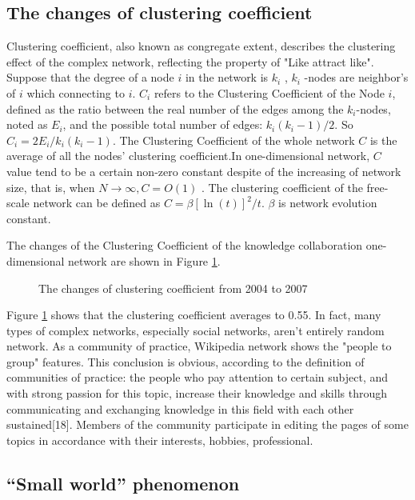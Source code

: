 \documentclass{elsarticle}
\begin{document}
\subsection{ The changes of clustering coefficient}
\label{sec:chang-clust-coeff}

Clustering coefficient, also known as congregate extent, describes the
clustering effect of the complex network, reflecting the property
of "Like attract like". Suppose that the degree of a node $i$ in the
network is $k_i$  , $k_i$ -nodes are neighbor's of $i$ which
connecting to $i$.  $C_i$  refers to the Clustering
Coefficient of the Node $i$,  defined as the ratio between the
real number of the edges among the $k_i$-nodes, noted as $E_i$, and the possible total
number of edges: $k_i(k_i-1)/2$. So  $C_i=2E_i/k_i(k_i-1)$. The
Clustering Coefficient of the whole network $C$ is the average of all
the nodes’ clustering coefficient.In one-dimensional network, $C$ value  tend to be a certain non-zero
constant despite of the increasing of network size, that is, when
$N\rightarrow\infty,C=O(1)$ . The clustering coefficient of the
free-scale network  can be defined as $C=\beta[\ln(t)]^2/t$. $\beta$
is network evolution constant.

The changes of the Clustering Coefficient of the knowledge
collaboration one-dimensional network are shown in Figure \ref{fig:cluster-coeff}.
\begin{figure}[htpb]

  \centering
  \scalebox{0.3}{\texttt{[image: 04]}}
  \caption{ The changes of clustering coefficient from 2004 to 2007}
    \label{fig:cluster-coeff}
\end{figure}
 
 Figure \ref{fig:cluster-coeff} 
shows that the clustering coefficient averages to 0.55. In fact, many
types of complex networks, especially social networks, aren’t entirely
random network. As a community of practice, Wikipedia network shows
the "people to group" features. This conclusion is obvious, according
to the definition of communities of practice: the people who pay
attention to certain subject, and with strong passion for this topic,
increase their knowledge and skills through communicating and
exchanging knowledge in this field with each other sustained[18].
Members of the community participate in editing the pages of some topics  in accordance with their interests, hobbies, professional. 



\subsection{“Small world” phenomenon }
\label{sec:small-world-phen}
\end{document}
